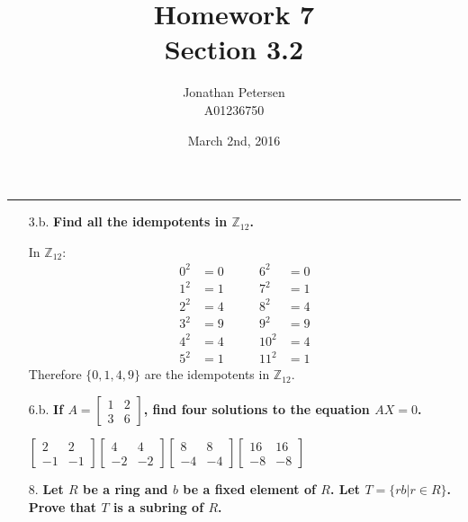 \documentclass{article}
\title{Homework 7 \\ Section 3.2}
\author{Jonathan Petersen \\ A01236750}
\date{March 2nd, 2016}
\begin{document}
	\maketitle
	\hrule 
	\vspace{5mm}
	\begin{enumerate}
		\item [3.b.] \textbf{Find all the idempotents in $\mathbb{Z}_{12}$.}

			In $\mathbb{Z}_{12}$:
			\begin{align*}
				0^2 & = 0	& \qquad  6^2 & = 0 \\
				1^2 & = 1	& \qquad  7^2 & = 1 \\
				2^2 & = 4	& \qquad  8^2 & = 4 \\
				3^2 & = 9	& \qquad  9^2 & = 9 \\
				4^2 & = 4 	& \qquad 10^2 & = 4 \\
				5^2 & = 1 	& \qquad 11^2 & = 1 
			\end{align*}
			Therefore $\lbrace 0, 1, 4, 9 \rbrace$ are the idempotents in $\mathbb{Z}_{12}$.

		\item [6.b.] \textbf{If $A = \begin{bmatrix}1 & 2 \\ 3 & 6 \end{bmatrix}$, find four 
				solutions to the equation $AX = 0$.}

			$
			\begin{bmatrix}
				2 & 2 \\ -1 & -1
			\end{bmatrix}
			\begin{bmatrix}
				4 & 4 \\ -2 & -2
			\end{bmatrix}
			\begin{bmatrix}
				8 & 8 \\ -4 & -4
			\end{bmatrix}
			\begin{bmatrix}
				16 & 16 \\ -8 & -8
			\end{bmatrix}
			$


		\item [8.] \textbf{Let $R$ be a ring and $b$ be a fixed element of $R$. Let $T = \lbrace rb
				| r \in R \rbrace$. Prove that $T$ is a subring of $R$.}	


\end{enumerate}
\end{document}
